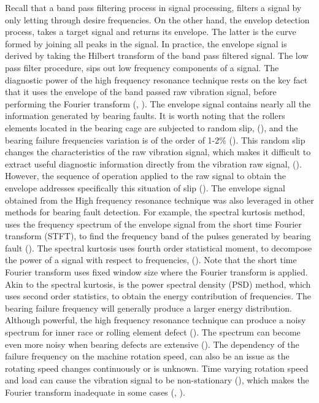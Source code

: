 \documentclass[../Main/thesis.tex]{subfiles}
\begin{document}
 \justify
  Recall that a band pass filtering process in signal processing, filters a signal by only letting through desire frequencies. On the other hand, the envelop detection process, takes a target signal and returns its envelope. The latter is the curve formed by joining all peaks in the signal. In practice, the envelope signal is derived by taking the Hilbert transform of the band pass filtered signal. The low pass filter procedure, sips out low frequency components of a signal.
\justify
The diagnostic power of the high frequency resonance technique rests on the key fact that it uses the envelope of the band passed raw vibration signal, before performing the Fourier transform (\cite{mcfadden1984a}, \cite{randal2010}). The envelope signal contains nearly all the information generated by bearing faults. It is worth noting that the rollers elements located in the bearing cage are subjected to random slip, (\cite{mcfadden1984a}), and the bearing failure frequencies variation is of the order of 1-2$\%$ (\cite{randal2010}). This random slip changes the characteristics of the raw vibration signal, which makes it difficult to extract useful diagnostic information directly from the vibration raw signal, (\cite{randal2010}). However, the sequence of operation applied to the raw signal to obtain the envelope addresses specifically this situation of slip  (\cite{randal2010}). 
\justify
The envelope signal obtained from the High frequency resonance technique was also leveraged in other methods for bearing fault detection. For example, the spectral kurtosis method, uses the frequency spectrum of the envelope signal from the short time Fourier transform (STFT), to find the frequency band of the pulses generated by bearing fault (\cite{randal2010}). The spectral kurtosis uses fourth order statistical moment, to decompose the power of a signal with respect to frequencies, (\cite{randal2010}). Note that the short time Fourier transform uses fixed window size where the Fourier transform is applied. Akin to the spectral kurtosis, is the power spectral density (PSD) method, which uses second order statistics, to obtain the energy contribution of frequencies. The bearing failure frequency will generally produce a larger energy distribution.
\justify
 Although powerful, the high frequency resonance technique can produce a noisy spectrum for inner race or rolling element defect (\cite{mcfadden1984a}). The spectrum can become even more noisy when bearing defects are extensive (\cite{mcfadden1984a}). The dependency of the failure frequency on the machine rotation speed, can also be an issue as the rotating speed changes continuously or is unknown. Time varying rotation speed and load can cause the vibration signal to be non-stationary (\cite{zhao2014}), which makes the Fourier transform inadequate in some cases (\cite{huang98}, \cite{huang08}).
\end{document}
